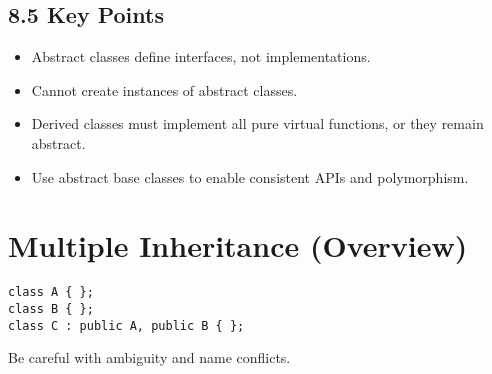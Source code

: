 \documentclass{article}
\begin{document}
\subsection*{8.5 Key Points}

\begin{itemize}
    \item Abstract classes define interfaces, not implementations.
    \item Cannot create instances of abstract classes.
    \item Derived classes must implement all pure virtual functions, or they remain abstract.
    \item Use abstract base classes to enable consistent APIs and polymorphism.
\end{itemize}


\section{Multiple Inheritance (Overview)}

\begin{lstlisting}[style=cppstyle]
class A { };
class B { };
class C : public A, public B { };
\end{lstlisting}

\noindent Be careful with ambiguity and name conflicts.
\end{document}
